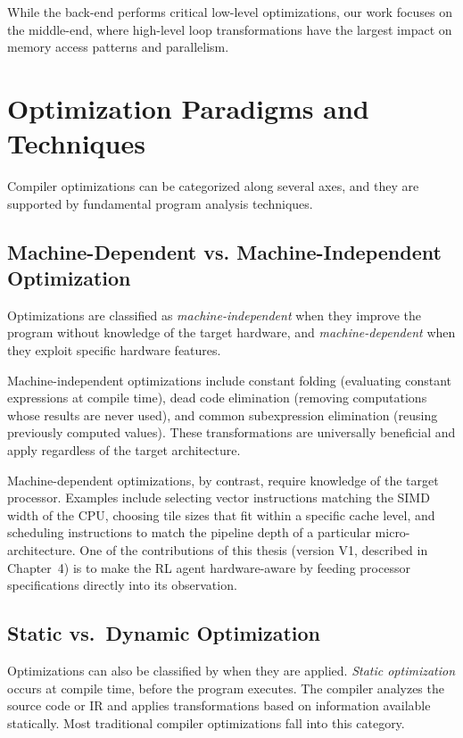 While the back-end performs critical low-level optimizations, our work focuses on the middle-end, where high-level loop transformations have the largest impact on memory access patterns and parallelism.

\section{Optimization Paradigms and Techniques}

Compiler optimizations can be categorized along several axes, and they are supported by fundamental program analysis techniques.

\subsection{Machine-Dependent vs. Machine-Independent Optimization}

Optimizations are classified as \textit{machine-independent} when they improve the program without knowledge of the target hardware, and \textit{machine-dependent} when they exploit specific hardware features.

Machine-independent optimizations include constant folding (evaluating constant expressions at compile time), dead code elimination (removing computations whose results are never used), and common subexpression elimination (reusing previously computed values). These transformations are universally beneficial and apply regardless of the target architecture.

Machine-dependent optimizations, by contrast, require knowledge of the target processor. Examples include selecting vector instructions matching the SIMD width of the CPU, choosing tile sizes that fit within a specific cache level, and scheduling instructions to match the pipeline depth of a particular micro-architecture. One of the contributions of this thesis (version V1, described in Chapter~4) is to make the RL agent hardware-aware by feeding processor specifications directly into its observation.

\subsection{Static vs.\ Dynamic Optimization}

Optimizations can also be classified by when they are applied. \textit{Static optimization} occurs at compile time, before the program executes. The compiler analyzes the source code or IR and applies transformations based on information available statically. Most traditional compiler optimizations fall into this category.

